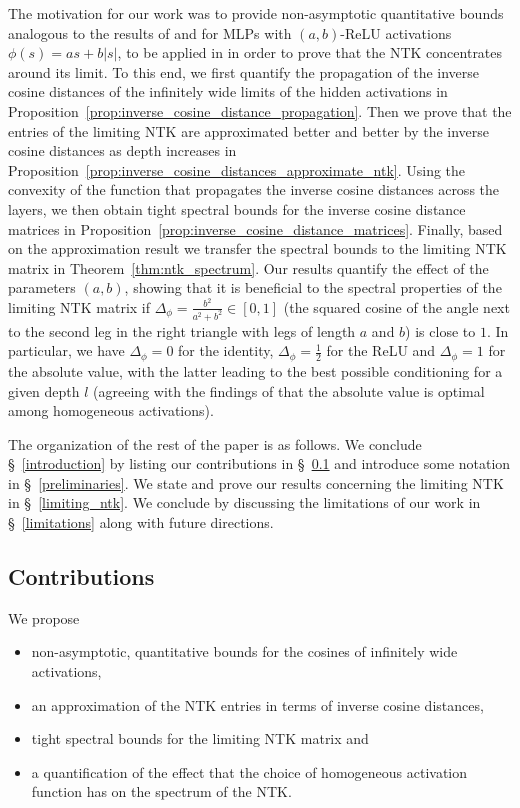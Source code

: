 \documentclass[twoside,11pt]{article}
\begin{document}
The motivation for our work was to provide non-asymptotic quantitative bounds analogous to the results of \citet{Hayouetal2019} and \citet{Xiaoetal2020} for MLPs with $(a,b)$-ReLU activations $\phi(s) = a s + b \vert s \vert$, to be applied in \citet{mlpsateoc2} in order to prove that the NTK concentrates around its limit. To this end, we first quantify the propagation of the inverse cosine distances of the infinitely wide limits of the hidden activations in Proposition~\ref{prop:inverse_cosine_distance_propagation}. Then we prove that the entries of the limiting NTK are approximated better and better by the inverse cosine distances as depth increases in Proposition~\ref{prop:inverse_cosine_distances_approximate_ntk}. Using the convexity of the function that propagates the inverse cosine distances across the layers, we then obtain tight spectral bounds for the inverse cosine distance matrices in Proposition~\ref{prop:inverse_cosine_distance_matrices}. Finally, based on the approximation result we transfer the spectral bounds to the limiting NTK matrix in Theorem~\ref{thm:ntk_spectrum}. Our results quantify the effect of the parameters $(a,b)$, showing that it is beneficial to the spectral properties of the limiting NTK matrix if $\Delta_\phi = \frac{b^2}{a^2+b^2} \in [0,1]$ (the squared cosine of the angle next to the second leg in the right triangle with legs of length $a$ and $b$) is close to $1$. In particular, we have $\Delta_\phi=0$ for the identity, $\Delta_\phi=\frac{1}{2}$ for the ReLU and $\Delta_\phi=1$ for the absolute value, with the latter leading to the best possible conditioning for a given depth $l$ (agreeing with the findings of \citet{Yangetal2024} that the absolute value is optimal among homogeneous activations).

The organization of the rest of the paper is as follows. We conclude \S~\ref{introduction} by listing our contributions in \S~\ref{contributions} and introduce some notation in \S~\ref{preliminaries}. We state and prove our results concerning the limiting NTK in \S~\ref{limiting_ntk}. We conclude by discussing the limitations of our work in \S~\ref{limitations} along with future directions.

\subsection{Contributions} \label{contributions}
We propose
\begin{itemize}
\item non-asymptotic, quantitative bounds for the cosines of infinitely wide activations,
\item an approximation of the NTK entries in terms of inverse cosine distances,
\item tight spectral bounds for the limiting NTK matrix and
\item a quantification of the effect that the choice of homogeneous activation function has on the spectrum of the NTK.
\end{itemize}
\end{document}
